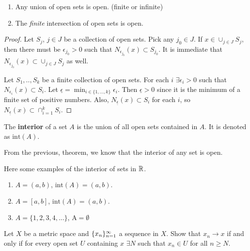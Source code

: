 \begin{theorem} $\,$
  \begin{enumerate} \label{thm:uio}
  \item Any union of open sets is open. (finite or infinite)
  \item The \emph{finite} intersection of open sets is open.
  \end{enumerate}
\end{theorem}
\begin{proof}
  Let $S_j$, $j \in J$ be a collection of open sets. Pick any $j_0 \in
  J$. If $x \in \cup_{j \in J} S_j$, then there must be $\epsilon_{j_0} >
  0$ such that $N_{\epsilon_{j_0}} (x) \subset S_{j_0}$. It is
  immediate that $N_{\epsilon_{j_0}} (x) \subset \cup_{j \in J} S_j$
  as well. 

  Let $S_1, .., S_k$ be a finite collection of open sets. For each $i$
  $\exists \epsilon_i > 0$ such that $N_{\epsilon_i}(x) \subset
  S_i$. Let $\underline{\epsilon} = \min_{i \in \{1,..., k\}}
  \epsilon_i$. Then $\underline{\epsilon}>0$ since it is the minimum
  of a finite set of positive numbers. Also,
  $N_{\underline{\epsilon}}(x) \subset S_i$ for each $i$, so
  $N_{\underline{\epsilon}}(x) \subset \cap_{i=1}^k S_i$. 
\end{proof}
\begin{definition}
  The \textbf{interior} of a set $A$ is the union of all open sets
  contained in $A$. It is denoted as $\mathrm{int}(A)$.
\end{definition}
From the previous, theorem, we know that the interior of any set is
open. 
\begin{example}
  Here some examples of the interior of sets in $\mathbb{R}$.
  \begin{enumerate}
  \item $A = (a,b)$, $\mathrm{int}(A) = (a,b)$.
  \item $A = [a,b]$, $\mathrm{int}(A) = (a,b)$.
  \item $A = \{1, 2, 3, 4, ... \}$, $\mathrm{A} = \emptyset$
  \end{enumerate}  
\end{example}

\begin{exercise} \label{ex:openConvergence}
  Let $X$ be a metric space and $\{{x}_n \}_{n=1}^\infty$ a sequence in $X$. Show that
  $x_n \to x$ if and only if for every open set $U$ containing $x$
  $\exists N$ such that $x_n \in U$ for all $n \geq N$.
\end{exercise}

